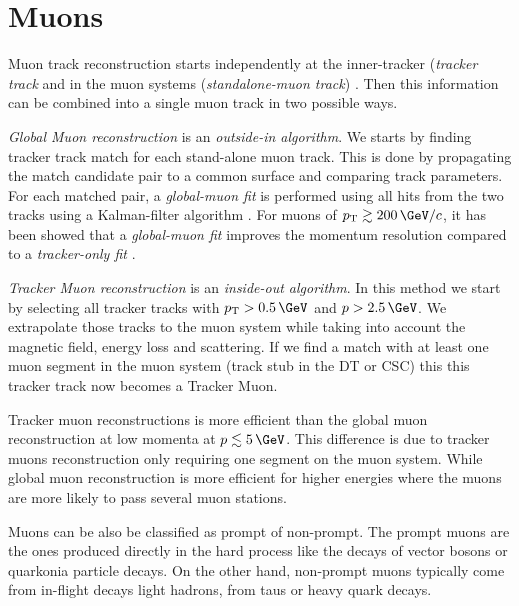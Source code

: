 \section{Muons}
\label{SECTION:EventReconstructionPhysicsObjects_Muons}


Muon track reconstruction starts independently at the inner-tracker (\textit{tracker track} and in the muon systems (\textit{standalone-muon track}) \cite{ARTICLE:CMSMuonReconstruction7TeV}. Then this information can be combined into a single muon track in two possible ways.

\textit{Global Muon reconstruction} is an \textit{outside-in algorithm}. We starts by finding tracker track match for each stand-alone muon track. This is done by propagating the match candidate pair to a common surface and comparing track parameters. For each matched pair, a \textit{global-muon fit} is performed using all hits from the two tracks using a Kalman-filter algorithm \cite{ARTICLE:KalmanFilteringTrackVertexFitting}. For muons of $\pt\gtrsim 200\,\GeV/c$, it has been showed that a \textit{global-muon fit} improves the momentum resolution compared to a \textit{tracker-only fit} \cite{CMSTDR:CMSPhysicsVol1, ARTICLE:CMSPerformanceMuonReconstructionCosmicRay}.

\textit{Tracker Muon reconstruction} is an \textit{inside-out algorithm}. In this method we start by selecting all tracker tracks with $\pt>0.5\,\GeV$ and $p>2.5\,\GeV$. We extrapolate those tracks to the muon system while taking into account the magnetic field, energy loss and scattering. If we find a match with at least one muon segment in the muon system (track stub in the \gls{DT} or \gls{CSC}) this this tracker track now becomes a Tracker Muon. 

Tracker muon reconstructions is more efficient than the global muon reconstruction at low momenta at $p\lesssim 5\,\GeV$. This difference is due to tracker muons reconstruction only requiring one segment on the muon system. While global muon reconstruction is more efficient for higher energies where the muons are more likely to pass several muon stations.

Muons can be also be classified as prompt of non-prompt. The prompt muons are the ones produced directly in the hard process like the decays of vector bosons or quarkonia particle decays. On the other hand, non-prompt muons typically come from in-flight decays light hadrons, from taus or heavy quark decays. 

